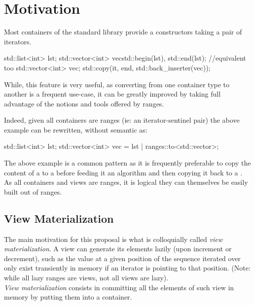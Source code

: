 \documentclass{wg21}
\begin{document}
\section{Motivation}

Most containers of the standard library provide a constructors taking a pair of iterators.

\begin{colorblock}
    std::list<int> lst;
    std::vector<int> vec{std::begin(lst), std::end(lst)};
    //equivalent too
    std::vector<int> vec;
    std::copy(it, end, std::back_inserter(vec));
\end{colorblock}

While, this feature is very useful, as converting from one container type to another is a frequent
use-case, it can be greatly improved by taking full advantage of the notions and tools offered by ranges.

Indeed, given all containers are ranges (ie: an iterator-sentinel pair) the above example can be rewritten, without semantic as:

\begin{colorblock}
    std::list<int> lst;
    std::vector<int> vec = lst | ranges::to<std::vector>;
\end{colorblock}


The above example is a common pattern as it is frequently preferable to copy the content of a  to
a  before feeding it an algorithm and then copying it back to a .\\

As all containers and views are ranges, it is logical they can themselves be easily built out of ranges.

\subsection{View Materialization}

The main motivation for this proposal is what is colloquially called \emph{view materialization}.
A view can generate its elements lazily (upon increment or decrement), such as the value at a given position of the sequence
iterated over only exist transiently in memory if an iterator is pointing to that position.
(Note: while all lazy ranges are views, not all views are lazy).\\

\emph{View materialization} consists in committing all the elements of such view in memory by putting them into a container.
\end{document}
